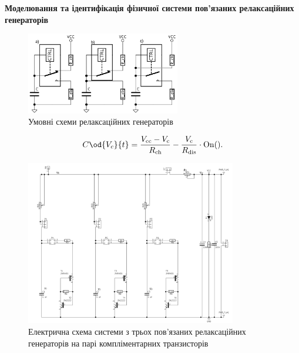 \documentclass[14pt,handout,utf8]{beamer}
\newcommand{\Tidx}[1]{%
  _\mathrm{#1}
}
\newcommand{\Xhead}[1]{
 \begin{center}%
      \textbf{#1}%
 \end{center}%
}
\newcommand{\RelaxBjtIi}{системи з трьох пов'язаних релаксаційних генераторів на парі компліментарних транзисторів}
\begin{document}
\begin{frame}
  \frametitle{~}
  \Xhead{Моделювання та ідентифікація фізичної системи пов'язаних релаксаційних генераторів}

  \begin{figure}
    \includegraphics[width=0.60\textwidth]{../p7/p/relax_types.png}
    \caption{Умовні схеми релаксаційних генераторів}
  \end{figure}

\begin{equation}
  C \od{V_c}{t}
  =
  \frac{V\Tidx{cc} - V\Tidx{c}}{R\Tidx{ch}}
  - \frac{V\Tidx{c}}{R\Tidx{dis}} \cdot \mathrm{On}().
  \label{atu:eq:relax0}
\end{equation}

  \begin{figure}
    \centerline{\includegraphics[width=0.82\textwidth]{../p7/p/relax3d_schem.png} }
    \caption{Електрична схема \RelaxBjtIi}
  \end{figure}


\end{frame}


\end{document}
